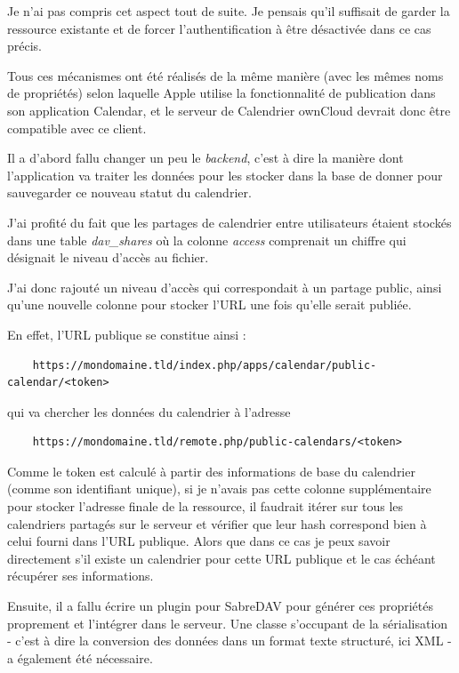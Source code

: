 \documentclass[10pt,a4paper]{report}
\begin{document}
	Je n'ai pas compris cet aspect tout de suite. Je pensais qu'il suffisait de garder la ressource existante et de forcer l'authentification à être désactivée dans ce cas précis.
	
	Tous ces mécanismes ont été réalisés de la même manière (avec les mêmes noms de propriétés) selon laquelle Apple utilise la fonctionnalité de publication dans son application Calendar, et le serveur de Calendrier ownCloud devrait donc être compatible avec ce client.
	
	Il a d'abord fallu changer un peu le \textit{backend}, c'est à dire la manière dont l'application va traiter les données pour les stocker dans la base de donner pour sauvegarder ce nouveau statut du calendrier.
	
	J'ai profité du fait que les partages de calendrier entre utilisateurs étaient stockés dans une table \textit{dav\_shares} où la colonne \textit{access} comprenait un chiffre qui désignait le niveau d'accès au fichier.
	
	J'ai donc rajouté un niveau d'accès qui correspondait à un partage public, ainsi qu'une nouvelle colonne pour stocker l'URL une fois qu'elle serait publiée. 
	
	En effet, l'URL publique se constitue ainsi : 
	\begin{verbatim}
	https://mondomaine.tld/index.php/apps/calendar/public-calendar/<token>
	\end{verbatim}
	qui va chercher les données du calendrier à l'adresse
	\begin{verbatim}
	https://mondomaine.tld/remote.php/public-calendars/<token>
	\end{verbatim}
	
	Comme le token est calculé à partir des informations de base du calendrier (comme son identifiant unique), si je n'avais pas cette colonne supplémentaire pour stocker l'adresse finale de la ressource, il faudrait itérer sur tous les calendriers partagés sur le serveur et vérifier que leur hash correspond bien à celui fourni dans l'URL publique. Alors que dans ce cas je peux savoir directement s'il existe un calendrier pour cette URL publique et le cas échéant récupérer ses informations.
	
	Ensuite, il a fallu écrire un plugin pour SabreDAV pour générer ces propriétés proprement et l'intégrer dans le serveur. Une classe s'occupant de la sérialisation - c'est à dire la conversion des données dans un format texte structuré, ici XML - a également été nécessaire.
	
\end{document}
